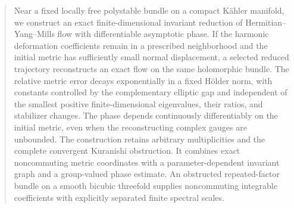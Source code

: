 

\begin{abstract}
Near a fixed locally free polystable bundle on a compact K\"ahler manifold,
we construct an exact finite-dimensional invariant reduction of
Hermitian--Yang--Mills flow with differentiable asymptotic phase.
If the harmonic deformation coefficients remain in a prescribed
neighborhood and the initial metric has sufficiently small normal
displacement, a selected reduced trajectory reconstructs an exact flow on
the same holomorphic bundle. The relative metric error decays exponentially
in a fixed H\"older norm, with constants controlled by the complementary
elliptic gap and independent of the smallest positive finite-dimensional eigenvalues, their ratios,
and stabilizer changes. The phase depends continuously differentiably on
the initial metric, even when the reconstructing complex gauges are unbounded.
The construction retains arbitrary multiplicities and the complete
convergent Kuranishi obstruction. It combines exact noncommuting metric
coordinates with a parameter-dependent invariant graph and a group-valued
phase estimate. An obstructed repeated-factor bundle on a smooth bicubic
threefold supplies noncommuting integrable coefficients with explicitly
separated finite spectral scales.
\end{abstract}
\maketitle








